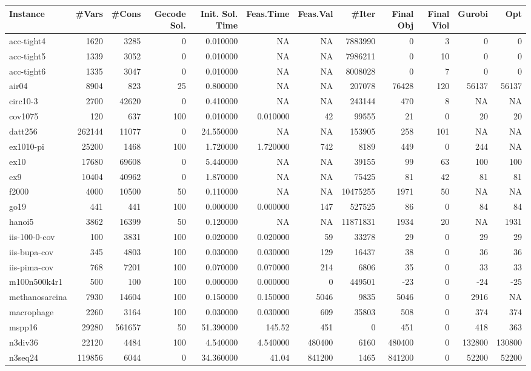 \begin{sidewaystable}
\centering
\begin{tabular}{|l|r|r|r|r|r|r|r|r|r|r|r|}
\hline
Instance    & \#Vars & \#Cons & Gecode Sol. & Init. Sol. Time & Feas.Time & Feas.Val & 
\#Iter & Final Obj & Final Viol & Gurobi & Opt \\ \hline
acc-tight4 & 1620 & 3285 & 0 & 0.010000 & NA & NA & 7883990 & 0 & 3 & 0 & 0\\ \hline 
acc-tight5 & 1339 & 3052 & 0 & 0.010000 & NA & NA & 7986211 & 0 & 10 & 0 & 0\\ \hline 
acc-tight6 & 1335 & 3047 & 0 & 0.010000 & NA & NA & 8008028 & 0 & 7 & 0 & 0\\ \hline 
air04 & 8904 & 823 & 25 & 0.800000 & NA & NA & 207078 & 76428 & 120  & 56137 & 56137 \\ \hline 
circ10-3 & 2700 & 42620 & 0 & 0.410000 & NA & NA & 243144 & 470 & 8 & NA & NA\\ \hline 
cov1075 & 120 & 637 & 100 & 0.010000 & 0.010000 & 42 & 99555 & 21 & 0 & 20 & 20\\ \hline 
datt256 & 262144 & 11077 & 0 & 24.550000 & NA & NA & 153905 & 258 & 101 & NA & NA\\ \hline 
ex1010-pi & 25200 & 1468 & 100 & 1.720000 & 1.720000 & 742 & 8189 & 449 & 0 & 244 & NA\\ \hline 
ex10 & 17680 & 69608 & 0 & 5.440000 & NA & NA & 39155 & 99 & 63 & 100 & 100\\ \hline 
ex9 & 10404 & 40962 & 0 & 1.870000 & NA & NA & 75425 & 81 & 42 & 81 & 81\\ \hline 
f2000 & 4000 & 10500 & 50 & 0.110000 & NA & NA & 10475255 & 1971 & 50 & NA & NA\\ \hline 
go19 & 441 & 441 & 100 & 0.000000 & 0.000000 & 147 & 527525 & 86 & 0 & 84 & 84\\ \hline 
hanoi5 & 3862 & 16399 & 50 & 0.120000 & NA & NA & 11871831 & 1934 & 20 & NA & 1931\\ \hline 
iis-100-0-cov & 100 & 3831 & 100 & 0.020000 & 0.020000 & 59 & 33278 & 29 & 0 & 29 & 29\\ \hline 
iis-bupa-cov & 345 & 4803 & 100 & 0.030000 & 0.030000 & 129 & 16437 & 38 & 0 & 36 & 36\\ \hline 
iis-pima-cov & 768 & 7201 & 100 & 0.070000 & 0.070000 & 214 & 6806 & 35 & 0 & 33 & 33\\ \hline 
m100n500k4r1 & 500 & 100 & 100 & 0.000000 & 0.000000 & 0 & 449501 & -23 & 0 & -24 & -25\\ \hline 
methanosarcina & 7930 & 14604 & 100 & 0.150000 & 0.150000 & 5046 & 9835 & 5046 & 0 & 2916 & NA\\ \hline 
macrophage & 2260 & 3164 & 100 & 0.030000 & 0.030000 & 609 & 35803 & 508 & 0 & 374 & 374\\ \hline 
mspp16 & 29280 & 561657 & 50 & 51.390000 & 145.52 & 451 & 0 & 451 & 0 & 418 & 363\\ \hline 
n3div36 & 22120 & 4484 & 100 & 4.540000 & 4.540000 & 480400 & 6160 & 480400 & 0 & 132800 & 130800\\ \hline 
n3seq24 & 119856 & 6044 & 0 & 34.360000 & 41.04 & 841200 & 1465 & 841200 & 0 & 52200 & 52200\\ \hline 



\end{tabular}
\end{sidewaystable}
